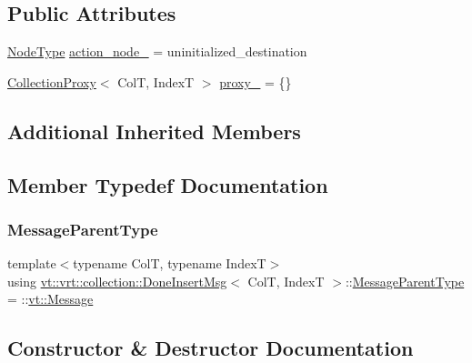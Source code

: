\subsection*{Public Attributes}
\begin{DoxyCompactItemize}
\item 
\hyperlink{namespacevt_a866da9d0efc19c0a1ce79e9e492f47e2}{Node\+Type} \hyperlink{structvt_1_1vrt_1_1collection_1_1_done_insert_msg_a73c8173c2b8170bfd6be91491d79a0ae}{action\+\_\+node\+\_\+} = uninitialized\+\_\+destination
\item 
\hyperlink{structvt_1_1vrt_1_1collection_1_1_collection_proxy}{Collection\+Proxy}$<$ ColT, IndexT $>$ \hyperlink{structvt_1_1vrt_1_1collection_1_1_done_insert_msg_a3e434d7629ebc4bed5372d30165ef08d}{proxy\+\_\+} = \{\}
\end{DoxyCompactItemize}
\subsection*{Additional Inherited Members}


\subsection{Member Typedef Documentation}
\mbox{\label{structvt_1_1vrt_1_1collection_1_1_done_insert_msg_a17cd2dd89315b0b113809e54f5a86b6a}} 
\subsubsection{\texorpdfstring{Message\+Parent\+Type}{MessageParentType}}
{\footnotesize\ttfamily template$<$typename ColT, typename IndexT$>$ \\
using \hyperlink{structvt_1_1vrt_1_1collection_1_1_done_insert_msg}{vt\+::vrt\+::collection\+::\+Done\+Insert\+Msg}$<$ ColT, IndexT $>$\+::\hyperlink{structvt_1_1messaging_1_1_active_msg_ac2e6d93267991027ce78c968b17064c7}{Message\+Parent\+Type} =  \+::\hyperlink{namespacevt_a3a3ddfef40b4c90915fa43cdd5f129ea}{vt\+::\+Message}}



\subsection{Constructor \& Destructor Documentation}
\mbox{\label{structvt_1_1vrt_1_1collection_1_1_done_insert_msg_a74e87cb9d8c83b77960b544e61cee9ef}} 
